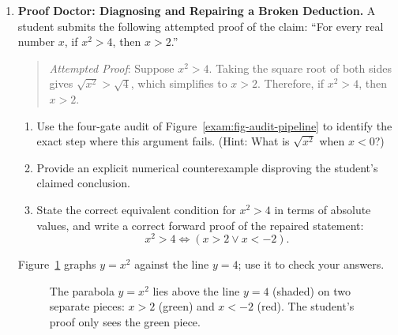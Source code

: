 \begin{enumerate}[resume]
  \item \textbf{Proof Doctor: Diagnosing and Repairing a Broken Deduction.}
  A student submits the following attempted proof of the claim: ``For every real number $x$, if $x^2 > 4$, then $x > 2$.''
  \begin{quote}
  \emph{Attempted Proof}: Suppose $x^2 > 4$. Taking the square root of both sides gives $\sqrt{x^2} > \sqrt{4}$, which simplifies to $x > 2$. Therefore, if $x^2 > 4$, then $x > 2$.
  \end{quote}
  \begin{enumerate}
    \item Use the four-gate audit of Figure~\ref{exam:fig-audit-pipeline} to identify the exact step where this argument fails. (Hint: What is $\sqrt{x^2}$ when $x < 0$?)
    \item Provide an explicit numerical counterexample disproving the student's claimed conclusion.
    \item State the correct equivalent condition for $x^2 > 4$ in terms of absolute values, and write a correct forward proof of the repaired statement:
    \[
    x^2 > 4 \iff (x > 2 \lor x < -2).
    \]
  \end{enumerate}
  Figure~\ref{exam:fig-proof-doctor} graphs $y = x^2$ against the line $y = 4$; use it to check your answers.

  \begin{figure}[htbp]
  \centering
  \caption{The parabola $y = x^2$ lies above the line $y = 4$ (shaded) on two separate pieces: $x > 2$ (green) and $x < -2$ (red). The student's proof only sees the green piece.}\label{exam:fig-proof-doctor}
  \end{figure}


\end{enumerate}
